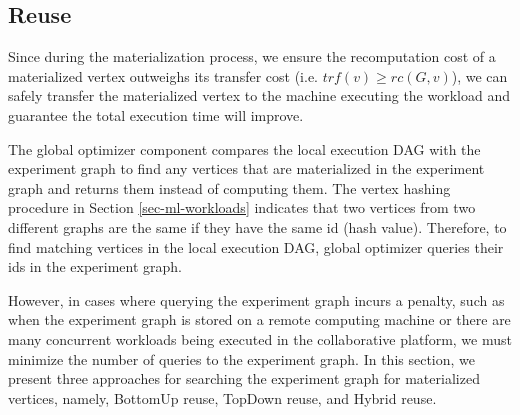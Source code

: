 

\subsection{Reuse}
Since during the materialization process, we ensure the recomputation cost of a materialized vertex outweighs its transfer cost (i.e. $trf(v) \geq rc(G,v)$), we can safely transfer the materialized vertex to the machine executing the workload and guarantee the total execution time will improve.

The global optimizer component compares the local execution DAG with the experiment graph to find any vertices that are materialized in the experiment graph and returns them instead of computing them.
The vertex hashing procedure in Section \ref{sec-ml-workloads} indicates that two vertices from two different graphs are the same if they have the same id (hash value).
Therefore, to find matching vertices in the local execution DAG, global optimizer queries their ids in the experiment graph.

However, in cases where querying the experiment graph incurs a penalty, such as when the experiment graph is stored on a remote computing machine or there are many concurrent workloads being executed in the collaborative platform, we must minimize the number of queries to the experiment graph.
In this section, we present three approaches for searching the experiment graph for materialized vertices, namely, BottomUp reuse, TopDown reuse, and Hybrid reuse.

